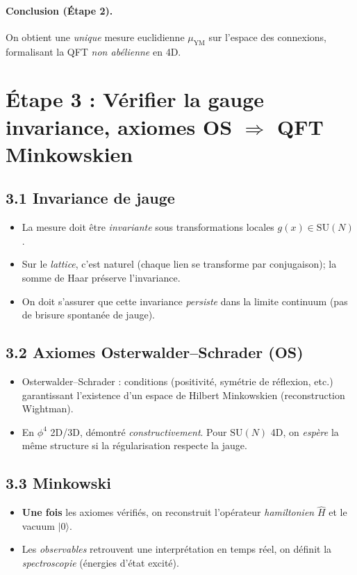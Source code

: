\documentclass[11pt]{article}
\begin{document}
\paragraph{Conclusion (Étape 2).}
On obtient une \emph{unique} mesure euclidienne $\mu_{\mathrm{YM}}$ sur l'espace des connexions, formalisant la QFT \emph{non abélienne} en 4D.

\section*{Étape 3 : Vérifier la gauge invariance, axiomes OS \(\Rightarrow\) QFT Minkowskien}

\subsection*{3.1 Invariance de jauge}

\begin{itemize}
  \item La mesure doit être \emph{invariante} sous transformations locales $g(x)\in \mathrm{SU}(N)$.
  \item Sur le \emph{lattice}, c'est naturel (chaque lien se transforme par conjugaison); la somme de Haar préserve l'invariance.
  \item On doit s'assurer que cette invariance \emph{persiste} dans la limite continuum (pas de brisure spontanée de jauge).
\end{itemize}

\subsection*{3.2 Axiomes Osterwalder--Schrader (OS)}

\begin{itemize}
  \item Osterwalder--Schrader : conditions (positivité, symétrie de réflexion, etc.) garantissant l'existence d'un espace de Hilbert Minkowskien (reconstruction Wightman).
  \item En $\phi^4$ 2D/3D, démontré \emph{constructivement}. Pour $\mathrm{SU}(N)$ 4D, on \emph{espère} la même structure si la régularisation respecte la jauge.
\end{itemize}

\subsection*{3.3 Minkowski}

\begin{itemize}
  \item \textbf{Une fois} les axiomes vérifiés, on reconstruit l'opérateur \emph{hamiltonien} $\hat{H}$ et le vacuum $|0\rangle$.
  \item Les \emph{observables} retrouvent une interprétation en temps réel, on définit la \emph{spectroscopie} (énergies d'état excité).
\end{itemize}
\end{document}
